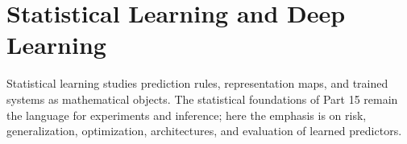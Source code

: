 \part{Statistical Learning and Deep Learning}

Statistical learning studies prediction rules, representation maps, and trained systems as mathematical objects.  The statistical foundations of Part 15 remain the language for experiments and inference; here the emphasis is on risk, generalization, optimization, architectures, and evaluation of learned predictors.









